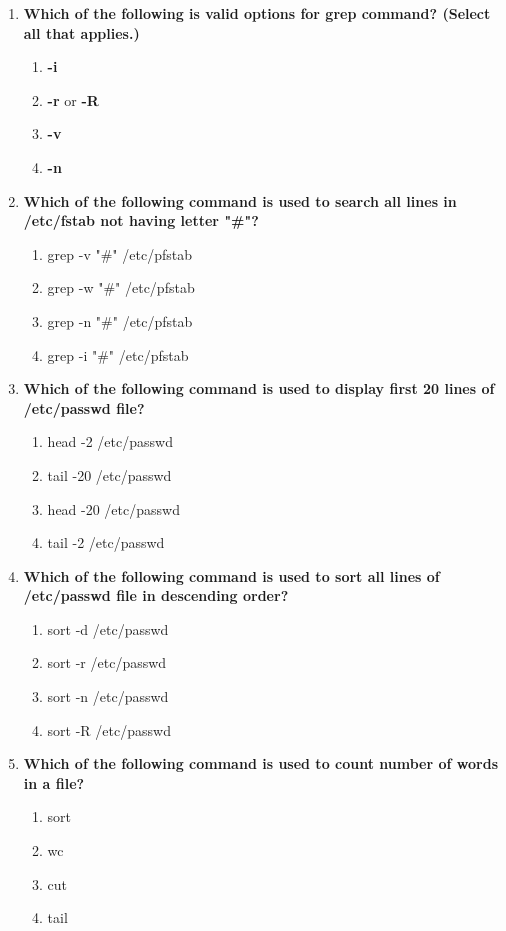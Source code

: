 \begin{flushleft}
\begin{enumerate}
		\item \textbf{Which of the following is valid options for grep command? (Select all that applies.)}
		\begin{enumerate}[label=(\alph*)]
			\item \textbf{-i}   %
  			\item \textbf{-r} or \textbf{-R}   %
			\item \textbf{-v}   %
			\item \textbf{-n}   %
		\end{enumerate}
		\bigskip
		\bigskip
		
		\item \textbf{Which of the following command is used to search all lines in \textbf{/etc/fstab} not having letter \textbf{"\#"}?}
		\begin{enumerate}[label=(\alph*)]
			\item grep -v "\#" /etc/pfstab  %
			\item grep -w "\#" /etc/pfstab  
			\item grep -n "\#" /etc/pfstab  
			\item grep -i "\#" /etc/pfstab  
		\end{enumerate}
		\bigskip
		\bigskip
		
		\item \textbf{Which of the following command is used to display first 20 lines of \textbf{/etc/passwd} file?}
		\begin{enumerate}[label=(\alph*)]
			\item head -2 /etc/passwd
			\item tail -20 /etc/passwd
			\item head -20 /etc/passwd   %
			\item tail -2 /etc/passwd
		\end{enumerate}
	
		\bigskip
		\bigskip
		\item \textbf{Which of the following command is used to sort all lines of \textbf{/etc/passwd} file in descending order?}
		\begin{enumerate}[label=(\alph*)]
			\item sort -d /etc/passwd
			\item sort -r /etc/passwd   %
			\item sort -n /etc/passwd
			\item sort -R /etc/passwd
		\end{enumerate}
	
		\bigskip
		\bigskip
		\item \textbf{Which of the following command is used to count number of words in a file?}
		\begin{enumerate}[label=(\alph*)]
			\item sort
			\item wc   %
			\item cut
			\item tail
		\end{enumerate}
	

\end{enumerate}
\end{flushleft}
